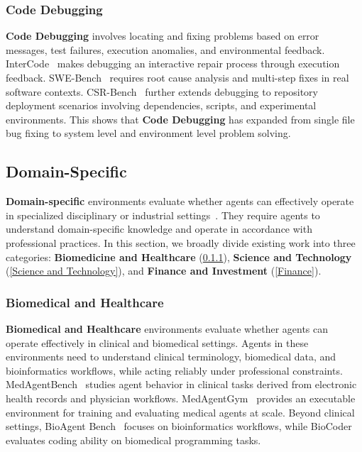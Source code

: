 \documentclass{llmxive}
\begin{document}
\subsubsection{Code Debugging}
\label{Code Debugging}
\textbf{Code Debugging} involves locating and fixing problems based on error messages, test failures, execution anomalies, and environmental feedback.
InterCode~\cite{InterCode} makes debugging an interactive repair process through execution feedback. 
SWE-Bench~\cite{SWE-Bench} requires root cause analysis and multi-step fixes in real software contexts. 
CSR-Bench~\cite{CSR-Bench} further extends debugging to repository deployment scenarios involving dependencies, scripts, and experimental environments. This shows that \textbf{Code Debugging} has expanded from single file bug fixing to system level and environment level problem solving.



\subsection{Domain-Specific}
\label{Domain-Specific}
\textbf{Domain-specific} environments evaluate whether agents can effectively operate in specialized disciplinary or industrial settings~\cite{MedAgentBench,MedAgentGym,BioAgent_Bench,Biocoder,DiscoveryWorld,ScienceAgentBench,MLE-bench,StockBench,FinDeepResearch,Finance_Agent_Benchmark}. They require agents to understand domain-specific knowledge and operate in accordance with professional practices. In this section, we broadly divide existing work into three categories: \textbf{Biomedicine and Healthcare} (\cref{Biomedical and Healthcare}), \textbf{Science and Technology} (\cref{Science and Technology}), and \textbf{Finance and Investment} (\cref{Finance}).

\subsubsection{Biomedical and Healthcare}
\label{Biomedical and Healthcare}
\textbf{Biomedical and Healthcare} environments evaluate whether agents can operate effectively in clinical and biomedical settings. Agents in these environments need to understand clinical terminology, biomedical data, and bioinformatics workflows, while acting reliably under professional constraints. MedAgentBench~\cite{MedAgentBench} studies agent behavior in clinical tasks derived from electronic health records and physician workflows. MedAgentGym~\cite{MedAgentGym} provides an executable environment for training and evaluating medical agents at scale. Beyond clinical settings, BioAgent Bench~\cite{BioAgent_Bench} focuses on bioinformatics workflows, while BioCoder~\cite{Biocoder} evaluates coding ability on biomedical programming tasks. 
\end{document}

